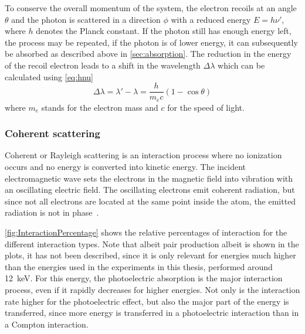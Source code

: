 To conserve the overall momentum of the system, the electron recoils at an angle $\theta$ and the photon is scattered in a direction $\phi$ with a reduced energy $E=h\nu'$, where $h$ denotes the Planck constant. If the photon still has enough energy left, the process may be repeated, if the photon is of lower energy, it can subsequently be absorbed as described above in \autoref{sec:absorption}. The reduction in the energy of the recoil electron leads to a shift in the wavelength $\Delta\lambda$ which can be calculated using \autoref{eq:hnu}
\begin{equation}
	\Delta\lambda = \lambda' - \lambda = \frac{h}{m_e c}(1-\cos{\theta})
	\label{eq:hnu}
\end{equation}
where $m_e$ stands for the electron mass and $c$ for the speed of light.

\subsubsection{Coherent scattering}
Coherent or Rayleigh scattering is an interaction process where no ionization occurs and no energy is converted into kinetic energy. The incident electromagnetic wave sets the electrons in the magnetic field into vibration with an oscillating electric field. The oscillating electrons emit coherent radiation, but since not all electrons are located at the same point inside the atom, the emitted radiation is not in phase~\cite{Hsieh2003,Stampanoni2002}.

\autoref{fig:InteractionPercentage} shows the relative percentages of interaction for the different interaction types. Note that albeit pair production albeit is shown in the plots, it has not been described, since it is only relevant for energies much higher than the energies used in the experiments in this thesis, performed around \SI{12}{\kilo\electronvolt}. For this energy, the photoelectric absorption is the major interaction process, even if it rapidly decreases for higher energies. Not only is the interaction rate higher for the photoelectric effect, but also the major part of the energy is transferred, since more energy is transferred in a photoelectric interaction than in a Compton interaction.

